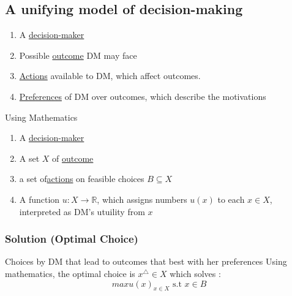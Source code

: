 \documentclass[twoside]{article}
\begin{document}
\subsection{A unifying model of decision-making}
\begin{enumerate}
	 \item A \underline{decision-maker}
      \item  Possible \underline{outcome} DM may face 
	\item \underline{Actions} available to DM, which affect outcomes.
\item \underline{Preferences} of DM over outcomes, which describe the motivations 
\end{enumerate}

Using Mathematics 
\begin{enumerate}
	 \item A \underline{decision-maker}
	 \item A set \(X\) of \underline{outcome}
	 \item a set of\underline{actions} on feasible choices \(B \subseteq X\)
	 \item A function \(u : X \rightarrow \mathbb{R} \), which assigns numbers \(u(x)\) to each \(x \in X\), interpreted as DM's utuility from \(x\)
\end{enumerate}

\subsubsection{Solution (Optimal Choice)}
Choices by DM that lead to outcomes that best with her preferences 
Using mathematics, the optimal choice is \(x^\triangle
 \in X\) which solves :  
\[ max u(x)_{x \in X} \text{ s.t  } x \in B \]
\end{document}
